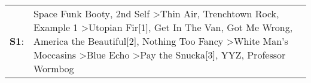 \begin{supertabular}{p{0.03\textwidth}p{0.92\textwidth}}
 \textbf{S1}:  &  Space Funk Booty\textsuperscript{}, \enspace 2nd Self\textsuperscript{} \textgreater \enspace Thin Air\textsuperscript{}, \enspace Trenchtown Rock\textsuperscript{}, \enspace Example 1\textsuperscript{} \textgreater \enspace Utopian Fir[1]\textsuperscript{}, \enspace Get In The Van\textsuperscript{}, \enspace Got Me Wrong\textsuperscript{}, \enspace America the Beautiful[2]\textsuperscript{}, \enspace Nothing Too Fancy\textsuperscript{} \textgreater \enspace White Man's Moccasins\textsuperscript{} \textgreater \enspace Blue Echo\textsuperscript{} \textgreater \enspace Pay the Snucka[3]\textsuperscript{}, \enspace YYZ\textsuperscript{}, \enspace Professor Wormbog\textsuperscript{}  \enspace  \\
\end{supertabular}

